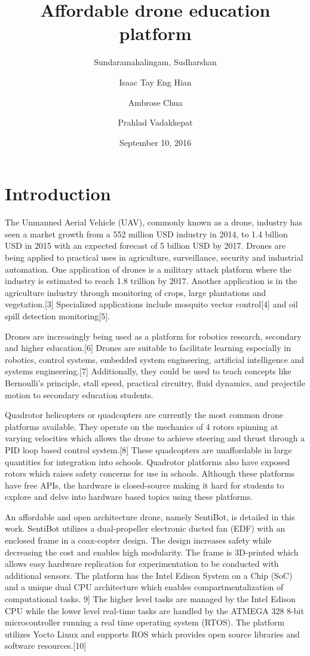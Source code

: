 \documentclass[12pt]{article}
\title{Affordable drone education platform}
\date{September 10, 2016}
\author{
	Sundaramahalingam, Sudharshan\\
	\and
	Isaac Tay Eng Hian\\
	\and
	Ambrose Chua\\
	\and
	Prahlad Vadakkepat
}
\begin{document}
\maketitle
{}
\newpage
{}

\section{Introduction}

The Unmanned Aerial Vehicle (UAV), commonly known as a drone, industry has seen a market growth from a 552 million USD industry in 2014, to 1.4 billion USD in 2015 with an expected forecast of 5 billion USD by 2017.\cite{legalandsocial} Drones are being applied to practical uses in agriculture, surveillance, security and industrial automation. One application of drones is a military attack platform where the industry is estimated to reach 1.8 trillion by 2017.\cite{dronewars} Another application is in the agriculture industry through monitoring of crops, large plantations and vegetation.[3] Specialized applications include mosquito vector control[4] and oil spill detection monitoring[5]. 

Drones are increasingly being used as a platform for robotics research, secondary and higher education.[6] Drones are suitable to facilitate learning especially in robotics, control systems, embedded system engineering, artificial intelligence and systems engineering.[7] Additionally, they could be used to teach concepts like Bernoulli’s principle, stall speed, practical circuitry, fluid dynamics, and projectile motion to secondary education students.

Quadrotor helicopters or quadcopters are currently the most common drone platforms available. They operate on the mechanics of 4 rotors spinning at varying velocities which allows the drone to achieve steering and thrust through a PID loop based control system.[8] These quadcopters are unaffordable in large quantities for integration into schools. Quadrotor platforms also have exposed rotors which raises safety concerns for use in schools. Although these platforms have free APIs, the hardware is closed-source making it hard for students to explore and delve into hardware based topics using these platforms.

An affordable and open architecture drone, namely SentiBot, is detailed in this work. SentiBot utilizes a dual-propeller electronic ducted fan (EDF) with an enclosed frame in a coax-copter design. The design increases safety while decreasing the cost and enables high modularity. The frame is 3D-printed which allows easy hardware replication for experimentation to be conducted with additional sensors. The platform has the Intel Edison System on a Chip (SoC) and a unique dual CPU architecture which enables compartmentalization of computational tasks. 9] The higher level tasks are managed by the Intel Edison CPU while the lower level real-time tasks are handled by the ATMEGA 328 8-bit microcontroller running a real time operating system (RTOS). The platform utilizes Yocto Linux and supports ROS which provides open source libraries and software resources.[10]
\end{document}
